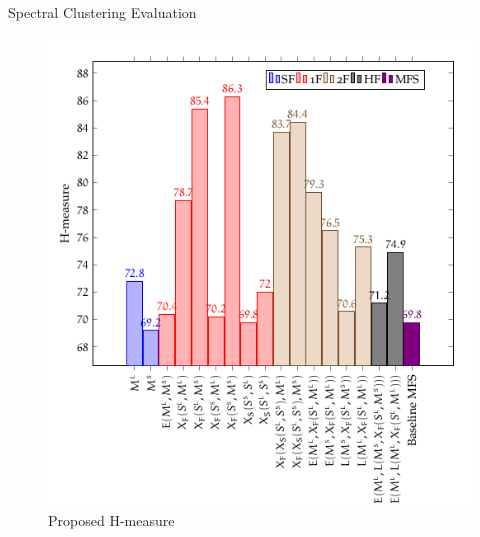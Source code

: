 \documentclass[10pt,=table]{beamer}
\begin{document}
\begin{frame}{Spectral Clustering Evaluation}
\begin{figure}
	\centering
	\includegraphics[width=.6\linewidth]{image2/Chapitre4/wsd_SC_Hm.png}
	\caption{Proposed H-measure}
\end{figure}
\end{frame}
\end{document}
